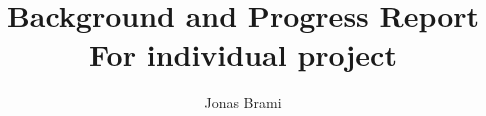 \begin{frontmatter}
%
\title{%
Background and Progress Report\\
\small For individual project  %
}
%
\author{Jonas Brami} 

%
%
\renewcommand*{\today}{\DayMonthYearDateFormat\displaydate{dateName}} 
%
%
\end{frontmatter}
%
%

\ 
\vspace{1cm}

\begin{minipage}{\textwidth}
    \tableofcontents
\end{minipage}
\clearpage